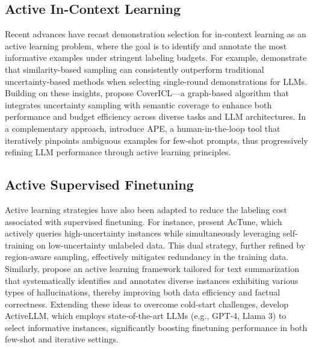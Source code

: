 


\subsection{Active In-Context Learning}
Recent advances have recast demonstration selection for in-context learning as an active learning problem, where the goal is to identify and annotate the most informative examples under stringent labeling budgets. For example, \citet{margatina2023active} demonstrate that similarity-based sampling can consistently outperform traditional uncertainty-based methods when selecting single-round demonstrations for LLMs. Building on these insights, \citet{mavromatis2024covericl} propose CoverICL—a graph-based algorithm that integrates uncertainty sampling with semantic coverage to enhance both performance and budget efficiency across diverse tasks and LLM architectures. In a complementary approach, \citet{qian2024ape} introduce APE, a human-in-the-loop tool that iteratively pinpoints ambiguous examples for few-shot prompts, thus progressively refining LLM performance through active learning principles.


\subsection{Active Supervised Finetuning}
Active learning strategies have also been adapted to reduce the labeling cost associated with supervised finetuning. For instance, \citet{yu-etal-2022-actune} present AcTune, which actively queries high-uncertainty instances while simultaneously leveraging self-training on low-uncertainty unlabeled data. This dual strategy, further refined by region-aware sampling, effectively mitigates redundancy in the training data. Similarly, \citet{xia-etal-2024-hallucination} propose an active learning framework tailored for text summarization that systematically identifies and annotates diverse instances exhibiting various types of hallucinations, thereby improving both data efficiency and factual correctness. Extending these ideas to overcome cold-start challenges, \citet{bayer2024activellm} develop ActiveLLM, which employs state-of-the-art LLMs (e.g., GPT-4, Llama 3) to select informative instances, significantly boosting finetuning performance in both few-shot and iterative settings.

